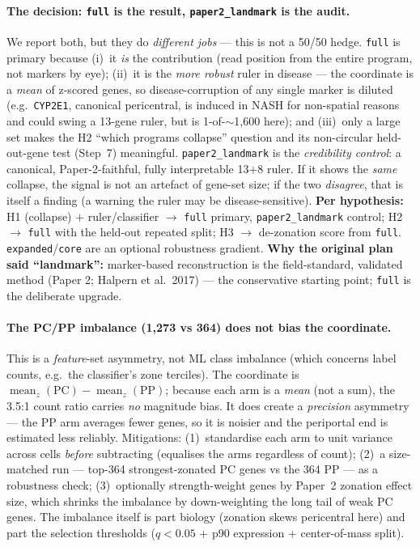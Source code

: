 \documentclass[11pt]{article}
\newcommand{\code}[1]{\texttt{\small #1}}
\begin{document}
\paragraph{The decision: \code{full} is the result, \code{paper2\_landmark} is the audit.}
We report both, but they do \emph{different jobs} --- this is not a 50/50 hedge.
\code{full} is primary because (i)~it \emph{is} the contribution (read position from the entire
program, not markers by eye); (ii)~it is the \emph{more robust} ruler in disease --- the coordinate is
a \emph{mean} of z-scored genes, so disease-corruption of any single marker is diluted (e.g.\
\code{CYP2E1}, canonical pericentral, is induced in NASH for non-spatial reasons and could swing a
13-gene ruler, but is 1-of-$\sim$1{,}600 here); and (iii)~only a large set makes the H2 ``which
programs collapse'' question and its non-circular held-out-gene test (Step~7) meaningful.
\code{paper2\_landmark} is the \emph{credibility control}: a canonical, Paper-2-faithful, fully
interpretable 13$+$8 ruler. If it shows the \emph{same} collapse, the signal is not an artefact of
gene-set size; if the two \emph{disagree}, that is itself a finding (a warning the ruler may be
disease-sensitive). \textbf{Per hypothesis:} H1 (collapse) $+$ ruler/classifier $\to$ \code{full}
primary, \code{paper2\_landmark} control; H2 $\to$ \code{full} with the held-out repeated split;
H3 $\to$ de-zonation score from \code{full}. \code{expanded}/\code{core} are an optional robustness
gradient. \textbf{Why the original plan said ``landmark'':} marker-based reconstruction is the
field-standard, validated method (Paper 2; Halpern et al.\ 2017) --- the conservative starting point;
\code{full} is the deliberate upgrade.

\paragraph{The PC/PP imbalance (1{,}273 vs 364) does not bias the coordinate.}
This is a \emph{feature}-set asymmetry, not ML class imbalance (which concerns label counts, e.g.\ the
classifier's zone terciles). The coordinate is $\operatorname{mean}_z(\text{PC}) -
\operatorname{mean}_z(\text{PP})$; because each arm is a \emph{mean} (not a sum), the 3.5:1 count ratio
carries \emph{no} magnitude bias. It does create a \emph{precision} asymmetry --- the PP arm averages
fewer genes, so it is noisier and the periportal end is estimated less reliably. Mitigations:
(1)~standardise each arm to unit variance across cells \emph{before} subtracting (equalises the arms
regardless of count); (2)~a size-matched run --- top-364 strongest-zonated PC genes vs the 364 PP --- as
a robustness check; (3)~optionally strength-weight genes by Paper~2 zonation effect size, which shrinks
the imbalance by down-weighting the long tail of weak PC genes. The imbalance itself is part biology
(zonation skews pericentral here) and part the selection thresholds ($q<0.05$ $+$ p90 expression $+$
center-of-mass split).
\end{document}
